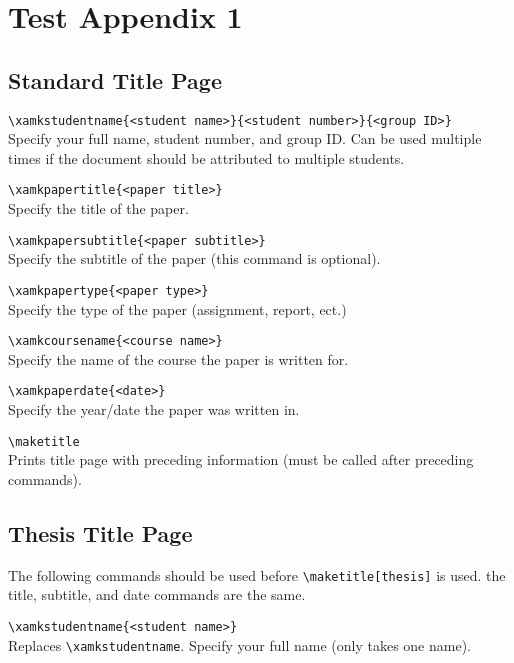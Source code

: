 \section{Test Appendix 1}

\subsection{Standard Title Page}

\verb|\xamkstudentname{<student name>}{<student number>}{<group ID>}|\\
Specify your full name, student number, and group ID.
Can be used multiple times if the document should be attributed to multiple students.

\verb|\xamkpapertitle{<paper title>}|\\
Specify the title of the paper.

\verb|\xamkpapersubtitle{<paper subtitle>}|\\
Specify the subtitle of the paper (this command is optional).

\verb|\xamkpapertype{<paper type>}|\\
Specify the type of the paper (assignment, report, ect.)

\verb|\xamkcoursename{<course name>}|\\
Specify the name of the course the paper is written for.

\verb|\xamkpaperdate{<date>}|\\
Specify the year/date the paper was written in.

\verb|\maketitle|\\
Prints title page with preceding information (must be called after preceding commands).

\subsection{Thesis Title Page}

The following commands should be used before \verb|\maketitle[thesis]| is used.
the title, subtitle, and date commands are the same.

\verb|\xamkstudentname{<student name>}|\\
Replaces \verb|\xamkstudentname|.
Specify your full name (only takes one name).

